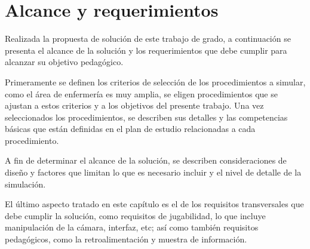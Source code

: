 \chapter{Alcance y requerimientos}
\label{chap:requerimientos}

Realizada la propuesta de solución de este trabajo de grado, a continuación se presenta 
el alcance de la solución y los requerimientos que debe cumplir para alcanzar su
objetivo pedagógico.

Primeramente se definen los criterios de selección de los procedimientos a simular, 
como el área de enfermería es muy amplia, se eligen procedimientos que se ajustan a 
estos criterios y a los objetivos del presente trabajo. Una vez seleccionados los 
procedimientos, se describen sus detalles y las competencias básicas que están definidas 
en el plan de estudio relacionadas a cada procedimiento. 

A fin de determinar el alcance de la solución, se describen consideraciones de diseño y factores
que limitan lo que es necesario incluir y el nivel de detalle de la simulación.

El último aspecto tratado en este capítulo es el de los requisitos transversales
que debe cumplir la solución, como requisitos de jugabilidad, lo que incluye manipulación de
la cámara, interfaz, etc; así como también requisitos pedagógicos, como la
retroalimentación y muestra de información.





